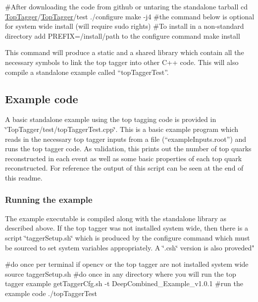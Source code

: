 \begin{DoxyCode}
\textcolor{preprocessor}{#After downloading the code from github or untaring the standalone tarball }
\textcolor{preprocessor}{}cd \hyperlink{classTopTagger}{TopTagger}/\hyperlink{classTopTagger}{TopTagger}/test
./configure
make -j4
\textcolor{preprocessor}{#the command below is optional for system wide install (will require sudo rights)}
\textcolor{preprocessor}{}\textcolor{preprocessor}{#To install in a non-standard directory add PREFIX=/install/path to the configure command}
\textcolor{preprocessor}{make install}
\end{DoxyCode}


This command will produce a static and a shared library which contain all the necessary symbols to link the top tagger into other C++ code. This will also compile a standalone example called ``top\-Tagger\-Test''.

\subsection*{Example code}

A basic standalone example using the top tagging code is provided in \char`\"{}\-Top\-Tagger/test/top\-Tagger\-Test.\-cpp\char`\"{}. This is a basic example program which reads in the necessary top tagger inputs from a file (``example\-Inputs.root'') and runs the top tagger code. As validation, this prints out the number of top quarks reconstructed in each event as well as some basic properties of each top quark reconstructed. For reference the output of this script can be seen at the end of this readme.

\subsubsection*{Running the example}

The example executable is compiled along with the standalone library as described above. If the top tagger was not installed system wide, then there is a script \char`\"{}tagger\-Setup.\-sh\char`\"{} which is produced by the configure command which must be sourced to set system variables appropriately. A \char`\"{}.\-csh\char`\"{} version is also proveded"


\begin{DoxyCode}
\textcolor{preprocessor}{#do once per terminal if opencv or the top tagger are not installed system wide}
\textcolor{preprocessor}{}source taggerSetup.sh
\textcolor{preprocessor}{#do once in any directory where you will run the top tagger example}
\textcolor{preprocessor}{}getTaggerCfg.sh -t DeepCombined\_Example\_v1.0.1
\textcolor{preprocessor}{#run the example code}
\textcolor{preprocessor}{./topTaggerTest}
\end{DoxyCode}


